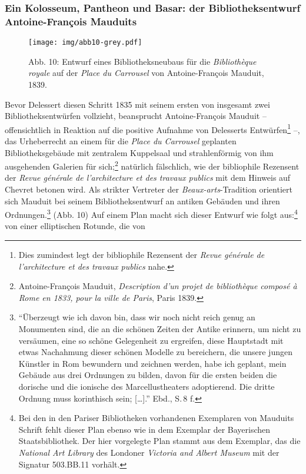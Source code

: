 \subsubsection{Ein Kolosseum, Pantheon und Basar: der Bibliotheksentwurf
Antoine-François
Mauduits}\label{ein-kolosseum-pantheon-und-basar-der-bibliotheksentwurf-antoine-franuxe7ois-mauduits}

\begin{figure}[htbp]
\centering
\texttt{[image: img/abb10-grey.pdf]}
\caption*{Abb. 10: Entwurf eines Bibliotheksneubaus für die
\emph{Bibliothèque royale} auf der \emph{Place du Carrousel} von
Antoine-François Mauduit, 1839.}
\end{figure}

Bevor Delessert diesen Schritt 1835 mit seinem ersten von insgesamt zwei
Bibliotheksentwürfen vollzieht, beansprucht Antoine-François Mauduit --
offensichtlich in Reaktion auf die positive Aufnahme von Delesserts
Entwürfen\footnote{Dies zumindest legt der bibliophile Rezensent der
  \emph{Revue générale de l'architecture et des travaux publics} nahe.}
--, das Urheberrecht an einem für die \emph{Place du Carrousel}
geplanten Bibliotheksgebäude mit zentralem Kuppelsaal und strahlenförmig
von ihm ausgehenden Galerien für sich;\footnote{Antoine-François
  Mauduit, \emph{Description d'un projet de bibliothèque composé à Rome
  en 1833, pour la ville de Paris}, Paris 1839.} natürlich fälschlich,
wie der bibliophile Rezensent der \emph{Revue générale de l'architecture
et des travaux publics} mit dem Hinweis auf Chevret betonen wird. Als
strikter Vertreter der \emph{Beaux-arts}-Tradition orientiert sich
Mauduit bei seinem Bibliotheksentwurf an antiken Gebäuden und ihren
Ordnungen.\footnote{\enquote{Überzeugt wie ich davon bin, dass wir noch
  nicht reich genug an Monumenten sind, die an die schönen Zeiten der
  Antike erinnern, um nicht zu versäumen, eine so schöne Gelegenheit zu
  ergreifen, diese Hauptstadt mit etwas Nachahmung dieser schönen
  Modelle zu bereichern, die unsere jungen Künstler in Rom bewundern und
  zeichnen werden, habe ich geplant, mein Gebäude aus drei Ordnungen zu
  bilden, davon für die ersten beiden die dorische und die ionische des
  Marcellustheaters adoptierend. Die dritte Ordnung muss korinthisch
  sein; {[}\ldots{}{]}.} Ebd., S.\,8 f.} (Abb. 10) Auf einem Plan macht
sich dieser Entwurf wie folgt aus:\footnote{Bei den in den Pariser
  Bibliotheken vorhandenen Exemplaren von Mauduits Schrift fehlt dieser
  Plan ebenso wie in dem Exemplar der Bayerischen Staatsbibliothek. Der
  hier vorgelegte Plan stammt aus dem Exemplar, das die \emph{National
  Art Library} des Londoner \emph{Victoria and Albert Museum} mit der
  Signatur 503.BB.11 vorhält.} von einer elliptischen Rotunde, die von
